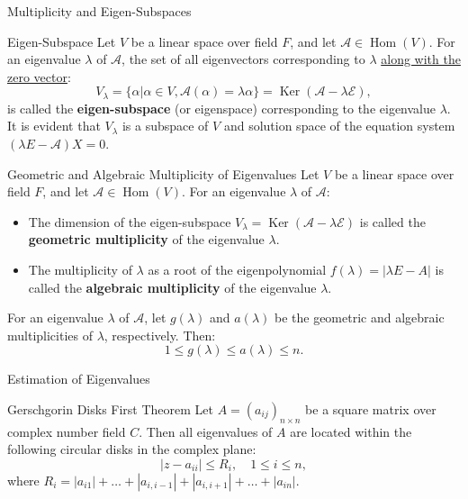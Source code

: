 \documentclass[11pt]{../../TexTemplate/elegantbook} %
\begin{document}
\begin{leftbarTitle}{Multiplicity and Eigen-Subspaces}\end{leftbarTitle}
\begin{definition}{Eigen-Subspace}
    Let \( V \) be a linear space over field \( F \), 
    and let \( \mathcal{A}\in \operatorname{Hom}(V) \).
    For an eigenvalue \( \lambda \) of \( \mathcal{A} \), 
    the set of all eigenvectors corresponding to \( \lambda \) \underline{along with the zero vector}:
    \[
    V_{\lambda} = \{ \alpha | \alpha \in V, \mathcal{A}(\alpha) = \lambda \alpha \} = 
    \operatorname{Ker}(\mathcal{A} - \lambda \mathcal{E}),
    \]
    is called the \textbf{eigen-subspace} (or eigenspace) corresponding to the eigenvalue \( \lambda \).
    It is evident that \( V_{\lambda} \) is a subspace of \( V \)
    and solution space of the equation system \( ( \lambda E - \mathcal{A})X = 0 \).
\end{definition}

\begin{definition}{Geometric and Algebraic Multiplicity of Eigenvalues}
    Let \( V \) be a linear space over field \( F \), 
    and let \( \mathcal{A}\in \operatorname{Hom}(V) \).
    For an eigenvalue \( \lambda \) of \( \mathcal{A} \):
    \begin{itemize}
        \item The dimension of the eigen-subspace \( V_{\lambda} = \operatorname{Ker}(\mathcal{A} - \lambda \mathcal{E}) \)
            is called the \textbf{geometric multiplicity} of the eigenvalue \( \lambda \).
        \item The multiplicity of \( \lambda \) as a root of the eigenpolynomial \( f(\lambda) = |\lambda E - A| \)
            is called the \textbf{algebraic multiplicity} of the eigenvalue \( \lambda \).
    \end{itemize}
\end{definition}

\begin{property}
    For an eigenvalue \( \lambda \) of \( \mathcal{A} \),
    let \( g(\lambda) \) and \( a(\lambda) \) be the geometric and algebraic multiplicities of \( \lambda \), respectively.
    Then:
    \[
    1 \leqslant g(\lambda) \leqslant a(\lambda) \leqslant n.
    \]
\end{property}

\begin{leftbarTitle}{Estimation of Eigenvalues}\end{leftbarTitle}
\begin{theorem}{Gerschgorin Disks First Theorem}
    Let \( A = (a_{ij})_{n \times n}\) be a square matrix over complex number field \( C \).
    Then all eigenvalues of \( A \) are located within the following circular disks in the complex plane:
    \[
    |z - a_{ii}| \leq R_i, \quad 1 \leq i \leq n,
    \]
    where \(R_i = |a_{i1}| + \dots + |a_{i,i-1}| + |a_{i,i+1}| + \dots + |a_{in}|\).
\end{theorem}
\end{document}
